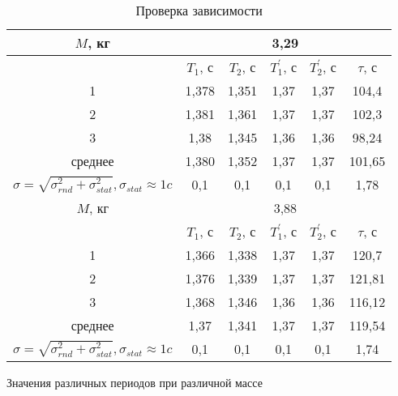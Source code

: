 \documentclass[a4paper, 12pt]{article}%
\begin{document}
\begin{center}
\begin{table}
\begin{center}
\begin{tabular}{|c|c|c|c|c|c|}
\hline
$M$, кг&\multicolumn{5}{|c|}{3,29} \\
\hline
&$T_1$, с&$T_2$, с&$T_1^{'}$, с&$T_2^{'}$, с& $ \tau $, с \\
\hline
1&1,378&1,351&1,37&1,37&104,4\\
\hline
2&1,381&1,361&1,37&1,37&102,3\\
\hline
3&1,38&1,345&1,36&1,36&98,24\\
\hline
среднее&1,380&1,352&1,37&1,37&101,65 \\
\hline
$\sigma = \sqrt{\sigma_{rnd}^2 + \sigma_{stat}^2}, \sigma_{stat} \approx 1 c$&0,1&0,1&0,1&0,1&1,78 \\
\hline
$M$, кг&\multicolumn{5}{|c|}{3,88} \\
\hline
&$T_1$, с&$T_2$, с&$T_1^{'}$, с&$T_2^{'}$, с& $ \tau $, с \\
\hline
1&1,366&1,338&1,37&1,37&120,7 \\
\hline
2&1,376&1,339&1,37&1,37&121,81 \\
\hline
3&1,368&1,346&1,36&1,36&116,12 \\
\hline
среднее&1,37&1,341&1,37&1,37&119,54 \\
\hline
$\sigma = \sqrt{\sigma_{rnd}^2 + \sigma_{stat}^2}, \sigma_{stat} \approx 1 c$&0,1&0,1&0,1&0,1&1,74 \\
\hline
\end{tabular}
\caption{Значения различных периодов при различной массе}
\end{center}
\caption{Проверка зависимости} 
\end{table}
\end{center}
\end{document}
